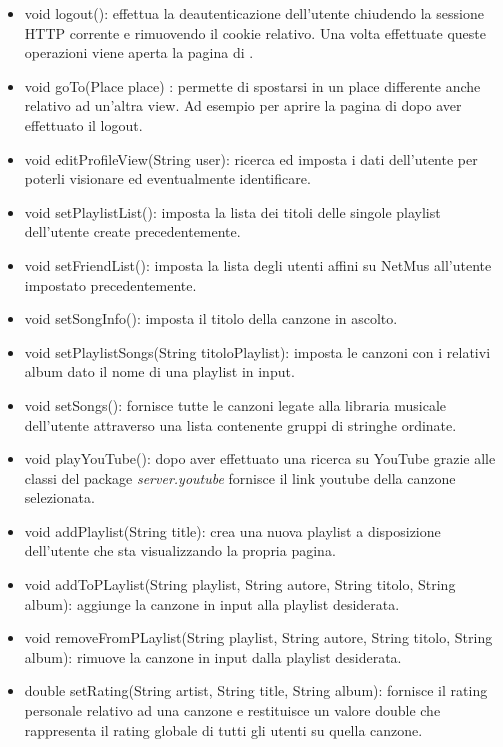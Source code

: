 \begin{itemize}
    \item void logout(): effettua la deautenticazione dell'utente chiudendo la
    sessione HTTP corrente e rimuovendo il cookie relativo. Una volta effettuate
    queste operazioni viene aperta la pagina di .
    \item void goTo(Place place) : permette di spostarsi in un place differente
    anche relativo ad un'altra view. Ad esempio per aprire la pagina di
     dopo aver effettuato il logout.
    \item void editProfileView(String user): ricerca ed imposta i dati 
    dell'utente per poterli visionare ed eventualmente identificare.
    \item void setPlaylistList(): imposta la lista dei
    titoli delle singole playlist dell'utente create precedentemente.
    \item void setFriendList(): imposta la lista degli
    utenti affini su NetMus all'utente impostato precedentemente.
    \item void setSongInfo(): imposta il titolo della canzone in
    ascolto.
    \item void setPlaylistSongs(String titoloPlaylist): imposta le canzoni
    con i relativi album dato il nome di una playlist in input.
    \item void setSongs(): fornisce tutte le canzoni legate alla libraria
    musicale dell'utente attraverso una lista contenente gruppi di stringhe
    ordinate.
    \item void playYouTube(): dopo aver effettuato una ricerca su YouTube grazie
    alle classi del package \emph{server.youtube} fornisce il link youtube della
    canzone selezionata.
    \item void addPlaylist(String title): crea una nuova playlist a
    disposizione dell'utente che sta visualizzando la propria pagina.
    \item void addToPLaylist(String playlist, String autore, String titolo,
    String album): aggiunge la canzone in input alla playlist desiderata.
    \item void removeFromPLaylist(String playlist, String autore, String titolo,
    String album): rimuove la canzone in input dalla playlist desiderata.
    \item double setRating(String artist, String title, String album): fornisce
    il rating personale relativo ad una canzone e restituisce un valore double
    che rappresenta il rating globale di tutti gli utenti su quella canzone.

\end{itemize}
